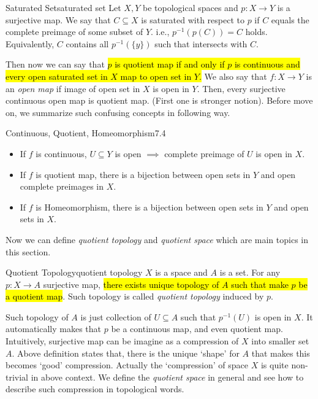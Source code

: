 \documentclass[12pt, a4paper, twoside]{article}
\theoremstyle{plain}
\begin{document}
\begin{defn}{Saturated Set}{saturated set}
    Let $X, Y$ be topological spaces and $p: X \rightarrow Y$ is a surjective map. 
    We say that $C \subseteq X$ is saturated with respect to $p$ if 
    $C$ equals the complete preimage of some subset of $Y$. i.e., $p^{-1}(p(C)) = C$ holds. Equivalently, 
    $C$ contains all $p^{-1}(\{y\})$ such that intersects with $C$. 
\end{defn}

Then now we can say that \hl{$p$ is quotient map if and only if $p$ is continuous and every open saturated set in $X$ map to open set in $Y$.}
We also say that $f: X \rightarrow Y$ is an \textit{open map} if image of open set in $X$ is open in $Y$. 
Then, every surjective continuous open map is quotient map. (First one is stronger notion). 
Before move on, we summarize such confusing concepts in following way. 

\begin{rem}{Continuous, Quotient, Homeomorphism}{7.4} 
    \begin{itemize}
        \item If $f$ is continuous, $U \subseteq Y$ is open $\implies$ complete preimage of $U$ is open in $X$. 
        \item If $f$ is quotient map, there is a bijection between open sets in $Y$ and open complete preimages in $X$. 
        \item If $f$ is Homeomorphism, there is a bijection between open sets in $Y$ and open sets in $X$. 
    \end{itemize}
\end{rem}

Now we can define \textit{quotient topology} and \textit{quotient space} which are main topics in this section. 
\begin{defn}{Quotient Topology}{quotient topology}
    $X$ is a space and $A$ is a set. For any $p: X \rightarrow A$ surjective map, 
    \hl{there exists unique topology of $A$ such that make $p$ be a quotient map}. 
    Such topology is called \textit{quotient topology} induced by $p$. 
\end{defn}

Such topology of $A$ is just collection of $U \subseteq A$ such that $p^{-1}(U)$ is open in $X$. 
It automatically makes that $p$ be a continuous map, and even quotient map. 
Intuitively, surjective map can be imagine as a compression of $X$ into smaller set $A$. 
Above definition states that, there is the unique \lq shape' for $A$ that makes this becomes \lq good' compression. 
Actually the \lq compression' of space $X$ is quite non-trivial in above context. 
We define the \textit{quotient space} in general and see how to describe such compression in topological words. 
\end{document}
